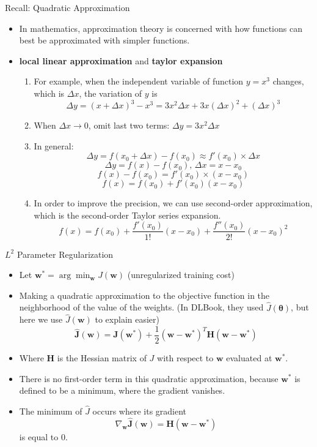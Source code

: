 \documentclass[10pt]{beamer}
\begin{document}
	\begin{frame}{Recall: Quadratic Approximation}
		\begin{itemize}
			\pause
			\item In mathematics, approximation theory is concerned with how functions can best be approximated with simpler functions.
			\pause
			\item \textbf{local linear approximation} and \textbf{taylor expansion}
			\begin{enumerate}
				\pause
				\item For example, when the independent variable of function $y=x^3$ changes, which is $\Delta x$, the variation of $y$ is
				$$\Delta y=(x+\Delta x)^3-x^3=3x^2\Delta x+3x(\Delta x)^2+(\Delta x)^3$$
				
				\pause
				\item When $\Delta x\rightarrow0$, omit last two terms: $\Delta y=3x^2\Delta x$
				\pause
				\item In general:
				$$\Delta y=f(x_0+\Delta x)-f(x_0)\approx f'(x_0)\times\Delta x$$
				$$\Delta y=f(x)-f(x_0)\text{,~}\Delta x=x-x_0$$
				$$f(x)-f(x_0)=f'(x_0)\times(x-x_0)$$
				$$f(x)=f(x_0)+f'(x_0)(x-x_0)$$
				
				\pause
				\item In order to improve the precision, we can use second-order approximation, which is the second-order Taylor series expansion.
				$$f(x)=f(x_0)+\frac{f'(x_0)}{1!}(x-x_0)+\frac{f''(x_0)}{2!}(x-x_0)^2$$
			\end{enumerate}
		\end{itemize}
	\end{frame}

	\begin{frame}{$L^2$ Parameter Regularization}
		\begin{itemize}
			\pause
			\item Let $\bm{w}^*=\arg\min_{\bm{w}}J(\bm{w})$ (unregularized training cost)
			\pause
			\item Making a quadratic approximation to the objective function in the neighborhood of the value of the weights. (In DLBook, they used $\hat{J}(\bm{\theta})$, but here we use $\hat{J}(\bm{w})$ to explain easier)
			$$\hat{\bm{J}}(\bm{w})=\bm{J}(\bm{w}^*)+\frac{1}{2}(\bm{w}-\bm{w}^*)^T\bm{\mathbf{H}}(\bm{w}-\bm{w}^*)$$
			\item Where $\mathbf{H}$ is the Hessian matrix of $J$ with respect to $\bm{w}$ evaluated at $\bm{w}^*$.
			\pause
			\item There is no first-order term in this quadratic approximation, because $\bm{w}^*$ is defined to be a minimum, where the gradient vanishes.
			\pause
			\item The minimum of $\hat{J}$ occurs where its gradient
			$$\nabla_{\bm{w}}\hat{\bm{J}}(\bm{w})=\mathbf{H}(\bm{w}-\bm{w}^*)$$
			is equal to 0.
		\end{itemize}
	\end{frame}
	
\end{document}
